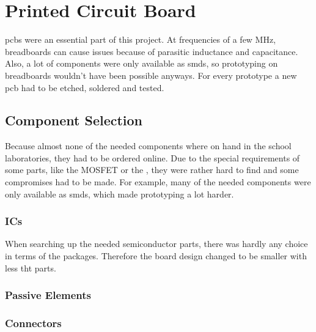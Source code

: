 \chapter{Printed Circuit Board}

\glspl{pcb} were an essential part of this project. At frequencies of a few MHz, breadboards can cause issues because of parasitic inductance and capacitance. Also, a lot of components were only available as \glspl{smd}, so prototyping on breadboards wouldn't have been possible anyways. For every prototype a new \gls{pcb} had to be etched, soldered and tested.

\section{Component Selection}

Because almost none of the needed components where on hand in the school laboratories, they had to be ordered online. Due to the special requirements of some parts, like the MOSFET or the , they were rather hard to find and some compromises had to be made.
For example, many of the needed components were only available as \glspl{smd}, which made prototyping a lot harder. 

\subsection{ICs}

When searching up the needed semiconductor parts, there was hardly any choice in terms of the packages. Therefore the board design changed to be smaller with less \gls{tht} parts.

\subsection{Passive Elements}



\subsection{Connectors}




